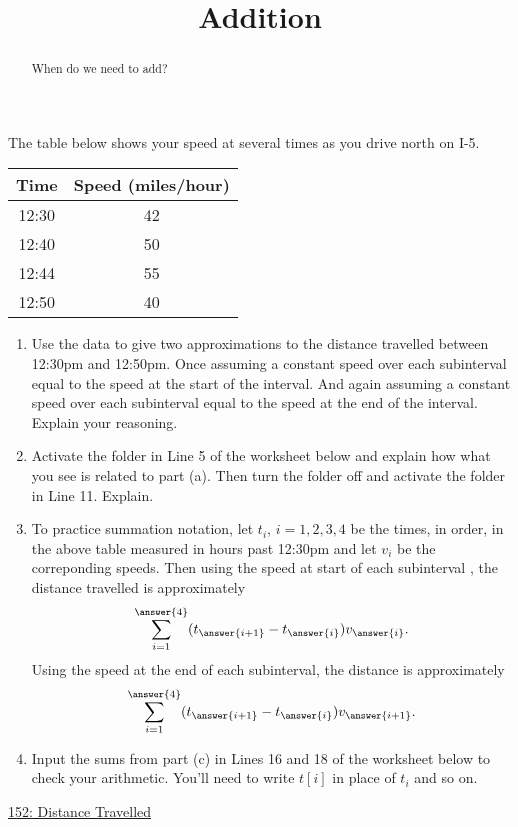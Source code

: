 \documentclass{ximera}
\title{Addition}
\begin{document}
\begin{abstract}
When do we need to add?
\end{abstract}
\maketitle


\begin{exercise}  \label{EXKDmFMERE}
The table below shows your speed at several times as you drive north on I-5. 

\begin{tabular}{|c|c|}
\hline
Time & Speed (miles/hour) \\
\hline
12:30 & 42 \\  \hline
12:40 & 50 \\ \hline
12:44 & 55 \\ \hline
12:50 & 40 \\
\hline
\end{tabular}


\begin{enumerate}
\item Use the data to give two approximations to the distance travelled between 12:30pm and 12:50pm. Once assuming a constant speed over each subinterval equal to the speed at the start of the interval. And again assuming a constant speed over each subinterval equal to the speed at the end of the interval. Explain your reasoning.

\item Activate the folder in Line 5 of the worksheet below and explain how what you see is related to part (a). Then turn the folder off and activate the folder in Line 11. Explain. 

\item To practice summation notation, let $t_i$, $i=1,2,3,4$ be the times, in order, in the above table measured in hours past 12:30pm and let $v_i$ be the correponding speeds. Then using the speed at start of each subinterval , the distance travelled is approximately 
\[
   \sum_{i=1}^{\answer{4}}(t_{\answer{i+1}} - t_{\answer{i}})v_{\answer{i}}. 
\]
Using the speed at the end of each subinterval, the distance is approximately
\[
    \sum_{i=1}^{\answer{4}}(t_{\answer{i+1}} - t_{\answer{i}})v_{\answer{i+1}}.
\]

\item Input the sums from part (c) in Lines 16 and 18 of the worksheet below to check your arithmetic. You'll need to write $t[i]$ in place of $t_i$ and so on.
\end{enumerate}

\begin{onlineOnly}
    \begin{center}
\end{center}
\end{onlineOnly}

\href{https://www.desmos.com/calculator/jjobuctzsa}{152: Distance Travelled}
\end{exercise}
\end{document}
